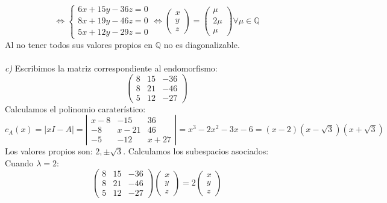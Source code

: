 \documentclass{article}
\begin{document}
$$
\Leftrightarrow \left\{ \begin{array}{c}
     6x+15y-36z =0  \\
     8x+19y-46z =0  \\
     5x+12y-29z =0
\end{array} \right.
\Leftrightarrow \left( \begin{array}{c}
      x \\
      y \\
      z
\end{array} \right) =
\left( \begin{array}{c}
      \mu \\
      2\mu \\
      \mu
\end{array} \right) \forall \mu \in \mathbb{Q}
$$
Al no tener todos sus valores propios en $\mathbb{Q}$ no es diagonalizable.\\\\
%
%
%
%
\textit{c)}
Escribimos la matriz correspondiente al endomorfismo:\\
$$
\left( \begin{array}{ccc}
    8 & 15 & -36\\
    8 & 21 & -46\\
    5 & 12 & -27
\end{array} \right)
$$
Calculamos el polinomio caraterístico:
$$
c_A(x) = |xI-A| = 
\left| \begin{array}{ccc}
    x-8 & -15 & 36\\
    -8 & x-21 & 46\\
    -5 & -12 & x+27
\end{array} \right| =
x^3-2x^2-3x-6 = (x-2)(x-\sqrt{3})(x+\sqrt{3})
$$
Los valores propios son: $2,\pm\sqrt{3}$. Calculamos los subespacios asociados:\\
Cuando $\lambda=2$:
$$
\left( \begin{array}{ccc}
    8 & 15 & -36\\
    8 & 21 & -46\\
    5 & 12 & -27
\end{array} \right)
\left( \begin{array}{c}
      x \\
      y \\
      z
\end{array} \right) = 2
\left( \begin{array}{c}
      x \\
      y \\
      z
\end{array} \right)
$$
\end{document}
